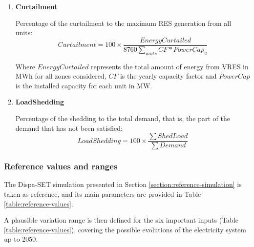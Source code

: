 \begin{enumerate}
    \item \textbf{Curtailment}

    Percentage of the curtailment to the maximum RES generation from all units:
    \begin{equation}
        Curtailment = 100\times \frac{EnergyCurtailed}{8760\sum_{units} CF * PowerCap_u}
    \end{equation}

    Where $EnergyCurtailed$ represents the total amount of energy from VRES in MWh for all zones considered, $CF$ is the yearly capacity factor and $PowerCap$ is the installed capacity for each unit in MW.

    \item \textbf{LoadShedding}

    Percentage of the shedding to the total demand, that is, the part of the demand that has not been satisfied:
    \begin{equation}
        LoadShedding = 100\times \frac{\sum ShedLoad}{\sum Demand}
    \end{equation}
\end{enumerate}


\subsubsection{Reference values and ranges}

The Dispa-SET simulation presented in Section \ref{section:reference-simulation} is taken as reference, and its main parameters are provided in Table \ref{table:reference-values}.

A plausible variation range is then defined for the six important inputs (Table \ref{table:reference-values}), covering the possible evolutions of the electricity system up to 2050.



